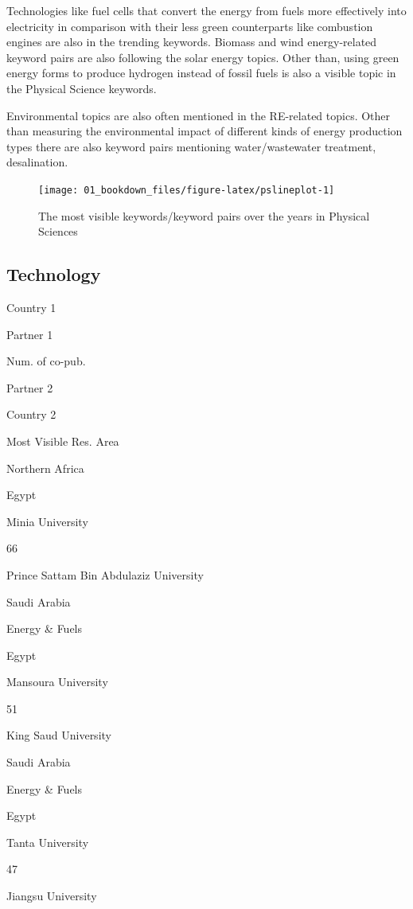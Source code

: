 \documentclass[
]{book}
\begin{document}
Technologies like fuel cells that convert the energy from fuels more effectively into electricity in comparison with their less green counterparts like combustion engines are also in the trending keywords. Biomass and wind energy-related keyword pairs are also following the solar energy topics. Other than, using green energy forms to produce hydrogen instead of fossil fuels is also a visible topic in the Physical Science keywords.

Environmental topics are also often mentioned in the RE-related topics. Other than measuring the environmental impact of different kinds of energy production types there are also keyword pairs mentioning water/wastewater treatment, desalination.

\begin{figure}
\texttt{[image: 01\_bookdown\_files/figure-latex/pslineplot-1]} \caption{The most visible keywords/keyword pairs over the years in Physical Sciences}\label{fig:pslineplot}
\end{figure}

\hypertarget{technology}{%
\subsection{Technology}\label{technology}}

Country 1

Partner 1

Num. of co-pub.

Partner 2

Country 2

Most Visible Res. Area

Northern Africa

{Egypt }

{Minia University }

{66}

{Prince Sattam Bin Abdulaziz University }

{Saudi Arabia }

{Energy \& Fuels }

{Egypt }

{Mansoura University }

{51}

{King Saud University }

{Saudi Arabia }

{Energy \& Fuels }

{Egypt }

{Tanta University }

{47}

{Jiangsu University }
\end{document}
